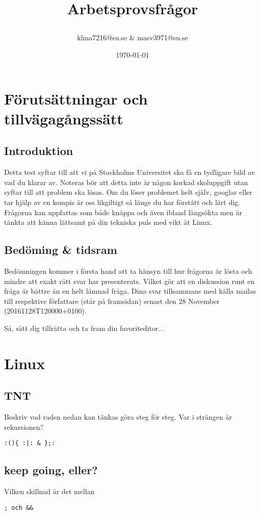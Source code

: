 \documentclass[a4paper]{report}
\title{Arbetsprovsfrågor\date{\today}}
\author{klma7216@su.se \& masv3971@su.se}
\begin{document}
    \maketitle
    \newpage

\chapter{Förutsättningar och tillvägagångssätt}
\section{Introduktion}
Detta test syftar till att vi på Stockholms Universitet ska få en tydligare bild av vad du klarar av. Noteras bör att detta inte är någon korkad skoluppgift utan syftar till att problem ska lösas. Om du löser problemet helt själv, googlar eller tar hjälp av en kompis är oss likgiltigt så länge du har förstått och lärt dig. Frågorna kan uppfattas som både knäppa och även ibland långsökta men är tänkta att känna lättsamt på din tekniska puls med vikt åt Linux. 


\section{Bedöming \& tidsram}
Bedömningen kommer i första hand att ta hänsyn till hur frågorna är lösta och mindre att exakt rätt svar har presenterats. Vilket gör att en diskussion runt en fråga är bättre än en helt lämnad fråga. 
\newline
Dina svar tillsammans med källa  mailas till respektive författare (står på framsidan) senast den 28 November (20161128T120000+0100).
\newline
\newline

Så, sätt dig tillrätta och ta fram din favoriteditor...
    \newpage

\chapter{Linux}
\section{TNT}
Beskriv vad raden nedan kan tänkas göra steg för steg. Var i strängen är rekursionen?

\begin{verbatim}
:(){ :|: & };:
\end{verbatim} 

\section{keep going, eller?}
Vilken skillnad är det mellan 
\begin{verbatim}
; och &&
\end{verbatim}
\end{document}
